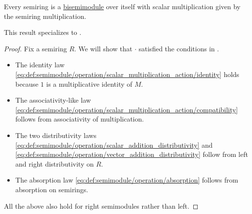 \begin{proposition}\label{thm:commutative_monoid_is_bisemimodule}
  Every semiring is a \hyperref[def:semimodule/bisemimodule]{bisemimodule} over itself with scalar multiplication given by the semiring multiplication.

  This result specializes to .
\end{proposition}
\begin{proof}
  Fix a semiring \( R \). We will show that \( \cdot \) satisfied the conditions in .
  \begin{itemize}
    \item The identity law \eqref{eq:def:semimodule/operation/scalar_multiplication_action/identity} holds because \( 1 \) is a multiplicative identity of \( M \).
    \item The associativity-like law \eqref{eq:def:semimodule/operation/scalar_multiplication_action/compatibility} follows from associativity of multiplication.
    \item The two distributivity laws \eqref{eq:def:semimodule/operation/scalar_addition_distributivity} and \eqref{eq:def:semimodule/operation/vector_addition_distributivity} follow from left and right distributivity on \( R \).
    \item The absorption law \eqref{eq:def:semimodule/operation/absorption} follows from absorption on semirings.
  \end{itemize}

  All the above also hold for right semimodules rather than left.
\end{proof}

